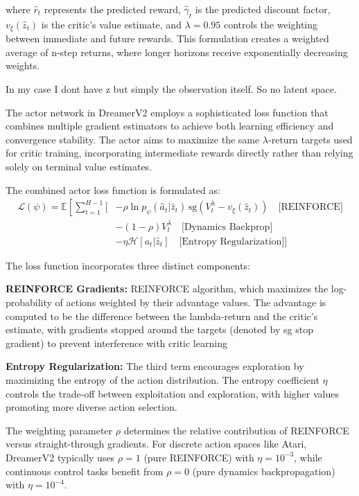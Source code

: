 \documentclass[
	english,
	ruledheaders=section,
	class=report,
	thesis={type=master},
	accentcolor=9c,
	custommargins=true,
	marginpar=false,
	parskip=half-,
	fontsize=11pt,
]{tudapub}
\begin{document}
where $\hat{r}_t$ represents the predicted reward, $\hat{\gamma}_t$ is the predicted discount factor, $v_\xi(\hat{z}_t)$ is the critic's value estimate, and $\lambda = 0.95$ controls the weighting between immediate and future rewards. This formulation creates a weighted average of n-step returns, where longer horizons receive exponentially decreasing weights.

In my case I dont have z but simply the observation itself. So no latent space.

The actor network in DreamerV2 employs a sophisticated loss function that combines multiple gradient estimators to achieve both learning efficiency and convergence stability. The actor aims to maximize the same $\lambda$-return targets used for critic training, incorporating intermediate rewards directly rather than relying solely on terminal value estimates.

The combined actor loss function is formulated as:
\begin{align}
	\mathcal{L}(\psi) = \mathbb{E}\left[\sum_{t=1}^{H-1} \Big[\right. & -\rho \ln p_\psi(\hat{a}_t | \hat{z}_t) \, \text{sg}(V^{\lambda}_t - v_\xi(\hat{z}_t)) \quad \text{[REINFORCE]} \\
	                                                                  & -(1-\rho)V^{\lambda}_t \quad \text{[Dynamics Backprop]}                                                         \\
	                                                                  & -\eta \mathcal{H}[a_t|\hat{z}_t] \quad \text{[Entropy Regularization]} \Big]
\end{align}

The loss function incorporates three distinct components:

\textbf{REINFORCE Gradients:}  REINFORCE algorithm, which maximizes the log-probability of actions weighted by their advantage values. The advantage is computed to be the difference between the lambda-return and the critic's estimate, with gradients stopped around the targets (denoted by sg stop gradient) to prevent interference with critic learning

\textbf{Entropy Regularization:} The third term encourages exploration by maximizing the entropy of the action distribution. The entropy coefficient $\eta$ controls the trade-off between exploitation and exploration, with higher values promoting more diverse action selection.

The weighting parameter $\rho$ determines the relative contribution of REINFORCE versus straight-through gradients. For discrete action spaces like Atari, DreamerV2 typically uses $\rho = 1$ (pure REINFORCE) with $\eta = 10^{-3}$, while continuous control tasks benefit from $\rho = 0$ (pure dynamics backpropagation) with $\eta = 10^{-4}$.
\end{document}
